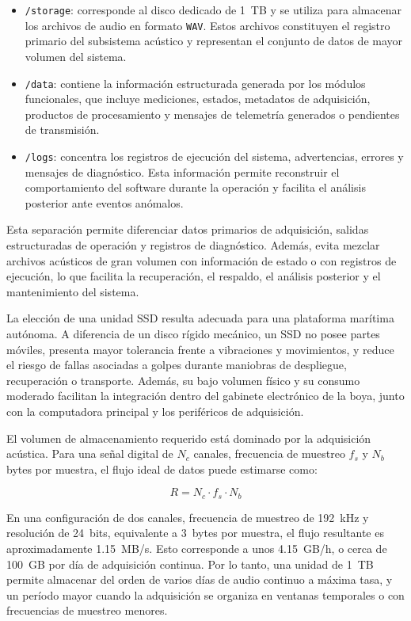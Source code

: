 \begin{itemize}
    \item \texttt{/storage}: corresponde al disco dedicado de 1~TB y se utiliza para almacenar los archivos de audio en formato \texttt{WAV}. Estos archivos constituyen el registro primario del subsistema acústico y representan el conjunto de datos de mayor volumen del sistema.

    \item \texttt{/data}: contiene la información estructurada generada por los módulos funcionales, que incluye mediciones, estados, metadatos de adquisición, productos de procesamiento y mensajes de telemetría generados o pendientes de transmisión.

    \item \texttt{/logs}: concentra los registros de ejecución del sistema, advertencias, errores y mensajes de diagnóstico. Esta información permite reconstruir el comportamiento del software durante la operación y facilita el análisis posterior ante eventos anómalos.
\end{itemize}

Esta separación permite diferenciar datos primarios de adquisición, salidas estructuradas de operación y registros de diagnóstico. Además, evita mezclar archivos acústicos de gran volumen con información de estado o con registros de ejecución, lo que facilita la recuperación, el respaldo, el análisis posterior y el mantenimiento del sistema.

La elección de una unidad SSD resulta adecuada para una plataforma marítima autónoma. A diferencia de un disco rígido mecánico, un SSD no posee partes móviles, presenta mayor tolerancia frente a vibraciones y movimientos, y reduce el riesgo de fallas asociadas a golpes durante maniobras de despliegue, recuperación o transporte. Además, su bajo volumen físico y su consumo moderado facilitan la integración dentro del gabinete electrónico de la boya, junto con la computadora principal y los periféricos de adquisición.

El volumen de almacenamiento requerido está dominado por la adquisición acústica. Para una señal digital de \(N_c\) canales, frecuencia de muestreo \(f_s\) y \(N_b\) bytes por muestra, el flujo ideal de datos puede estimarse como:

\begin{equation}
R = N_c \cdot f_s \cdot N_b
\label{eq:flujo-datos-acusticos}
\end{equation}

En una configuración de dos canales, frecuencia de muestreo de 192~kHz y resolución de 24~bits, equivalente a 3~bytes por muestra, el flujo resultante es aproximadamente 1.15~MB/s. Esto corresponde a unos 4.15~GB/h, o cerca de 100~GB por día de adquisición continua. Por lo tanto, una unidad de 1~TB permite almacenar del orden de varios días de audio continuo a máxima tasa, y un período mayor cuando la adquisición se organiza en ventanas temporales o con frecuencias de muestreo menores.

